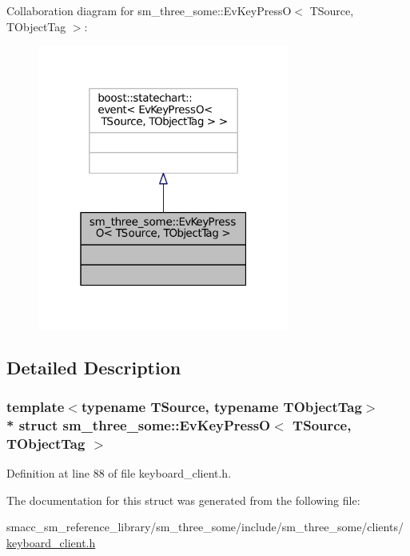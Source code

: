 Collaboration diagram for sm\+\_\+three\+\_\+some\+:\+:Ev\+Key\+PressO$<$ T\+Source, T\+Object\+Tag $>$\+:
\nopagebreak
\begin{figure}[H]
\begin{center}
\leavevmode
\includegraphics[width=235pt]{structsm__three__some_1_1EvKeyPressO__coll__graph}
\end{center}
\end{figure}


\subsection{Detailed Description}
\subsubsection*{template$<$typename T\+Source, typename T\+Object\+Tag$>$\\*
struct sm\+\_\+three\+\_\+some\+::\+Ev\+Key\+Press\+O$<$ T\+Source, T\+Object\+Tag $>$}



Definition at line 88 of file keyboard\+\_\+client.\+h.



The documentation for this struct was generated from the following file\+:\begin{DoxyCompactItemize}
\item 
smacc\+\_\+sm\+\_\+reference\+\_\+library/sm\+\_\+three\+\_\+some/include/sm\+\_\+three\+\_\+some/clients/\hyperlink{keyboard__client_8h}{keyboard\+\_\+client.\+h}\end{DoxyCompactItemize}
